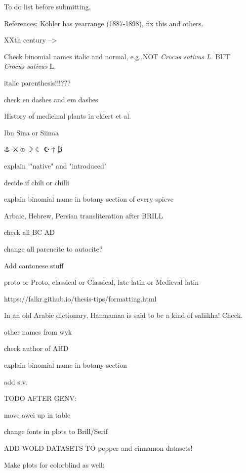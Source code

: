 To do list before submitting.

References: Köhler has yearrange (1887-1898), fix this and others.

XXth century --> \textss

Check binomial names italic and normal, e.g.,NOT \textit{Crocus sativus L.} BUT \textit{Crocus sativus} L.

italic parenthesis!!!???

check en dashes and em dashes

History of medicinal plants in ekiert et al.

Ibn Sina or Siinaa

⚓ 
⚔
⚭
☽
☾
☪
†
₿

explain '"native" and "introduced"

decide if chili or chilli

explain binomial name in botany section of every spicve


Arbaic, Hebrew, Persian transliteration after BRILL

check all BC AD


change all parencite to autocite?

Add cantonese stuff

proto or Proto, classical or Classical, late latin or Medieval latin

https://falkr.github.io/thesis-tips/formatting.html

In an old Arabic dictionary, Hamaamaa is said to be a kind of saliikha! Check.

other names from wyk

check author of AHD

explain binomial name in botany section

add s.v.

TODO AFTER GENV:

move awei up in table

change fonts in plots to Brill/Serif

ADD WOLD DATASETS TO pepper and cinnamon datasets!

Make plots for colorblind as well:

